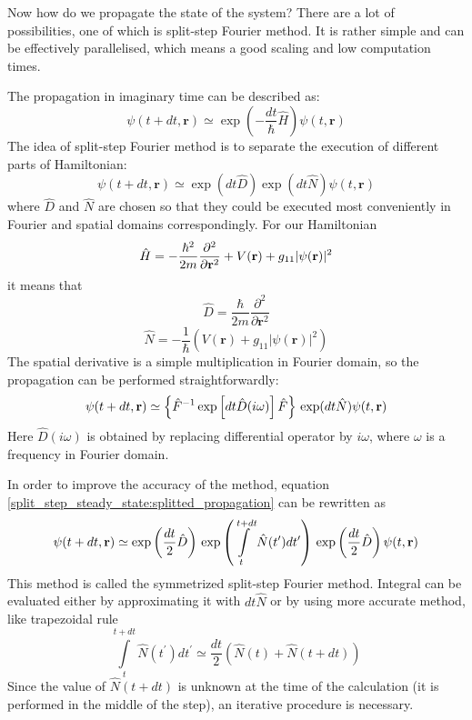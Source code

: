 \documentclass[12pt,notitlepage]{report}
\begin{document}
Now how do we propagate the state of the system? There are a lot of possibilities, one of which is split-step
Fourier method. It is rather simple and can be effectively parallelised, which means a good scaling and 
low computation times. 

The propagation in imaginary time can be described as:
\[ \psi(t + dt, \mathbf{r}) \simeq \exp \left( -\frac{dt}{\hbar} \hat{H} \right) \psi(t, \mathbf{r}) \]
The idea of split-step Fourier method is to separate the execution of different parts of Hamiltonian:
\begin{equation}
\label{split_step_steady_state:splitted_propagation}
\psi(t + dt, \mathbf{r}) \simeq \exp(dt \hat{D}) \exp(dt \hat{N}) \psi(t, \mathbf{r})
\end{equation}
where $\hat{D}$ and $\hat{N}$ are chosen so that they could be executed most conveniently in Fourier and spatial
domains correspondingly. For our Hamiltonian
\[ 
\hat{H} = -\frac{\hbar^2}{2m} \frac{\partial^2}{\partial \mathbf{r}^2} + \\
V(\mathbf{r}) + g_{11} \vert \psi(\mathbf{r}) \vert^2 
\]
it means that
\[ \hat{D} = \frac{\hbar}{2m} \frac{\partial^2}{\partial \mathbf{r}^2} \]
\[ \hat{N} = -\frac{1}{\hbar} \left( V(\mathbf{r}) + g_{11} \vert \psi(\mathbf{r}) \vert^2 \right) \] 
The spatial derivative is a simple multiplication in Fourier domain, so the propagation can be performed 
straightforwardly:
\[ 
\psi(t + dt, \mathbf{r}) \simeq \left\{ \hat{F}^{-1} \exp \left[ dt \hat{D}(i\omega) \right] \hat{F} \right\} \\
\exp(dt \hat{N}) \psi(t, \mathbf{r}) 
\]
Here $\hat{D}(i\omega)$ is obtained by replacing differential operator by $i \omega$, where $\omega$ is a
frequency in Fourier domain.

In order to improve the accuracy of the method, equation \ref{split_step_steady_state:splitted_propagation}
can be rewritten as
\[
\psi(t + dt, \mathbf{r}) \simeq \exp \left( \frac{dt}{2} \hat{D} \right) \\
\exp \left( \int\limits^{t + dt}_t \hat{N} (t^\prime) dt^\prime \right) \\
\exp \left( \frac{dt}{2} \hat{D} \right) \psi(t, \mathbf{r})
\]
This method is called the symmetrized split-step Fourier method. Integral can be evaluated either by approximating it
with $dt\hat{N}$ or by using more accurate method, like trapezoidal rule
\[ \int\limits^{t + dt}_t \hat{N} (t^\prime) dt^\prime \simeq \frac{dt}{2} \left( \hat{N}(t) + \hat{N}(t + dt) \right) \]
Since the value of $\hat{N}(t + dt)$ is unknown at the time of the calculation (it is performed in the
middle of the step), an iterative procedure is necessary.
\end{document}
